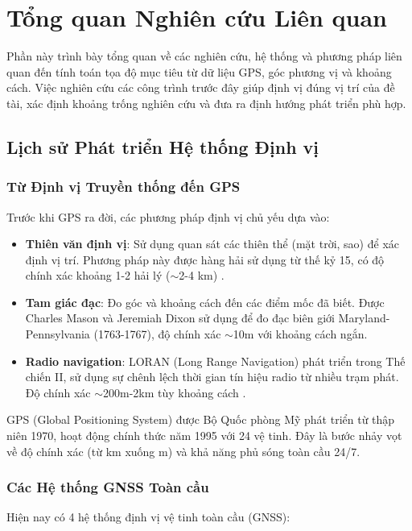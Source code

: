 \section{Tổng quan Nghiên cứu Liên quan}

Phần này trình bày tổng quan về các nghiên cứu, hệ thống và phương pháp liên quan đến tính toán tọa độ mục tiêu từ dữ liệu GPS, góc phương vị và khoảng cách. Việc nghiên cứu các công trình trước đây giúp định vị đúng vị trí của đề tài, xác định khoảng trống nghiên cứu và đưa ra định hướng phát triển phù hợp.

\subsection{Lịch sử Phát triển Hệ thống Định vị}

\subsubsection{Từ Định vị Truyền thống đến GPS}
Trước khi GPS ra đời, các phương pháp định vị chủ yếu dựa vào:
\begin{itemize}
    \item \textbf{Thiên văn định vị}: Sử dụng quan sát các thiên thể (mặt trời, sao) để xác định vị trí. Phương pháp này được hàng hải sử dụng từ thế kỷ 15, có độ chính xác khoảng 1-2 hải lý ($\sim$2-4 km) \cite{hofmann2012global}.
    
    \item \textbf{Tam giác đạc}: Đo góc và khoảng cách đến các điểm mốc đã biết. Được Charles Mason và Jeremiah Dixon sử dụng để đo đạc biên giới Maryland-Pennsylvania (1763-1767), độ chính xác $\sim$10m với khoảng cách ngắn.
    
    \item \textbf{Radio navigation}: LORAN (Long Range Navigation) phát triển trong Thế chiến II, sử dụng sự chênh lệch thời gian tín hiệu radio từ nhiều trạm phát. Độ chính xác $\sim$200m-2km tùy khoảng cách \cite{kaplan2017understanding}.
\end{itemize}

GPS (Global Positioning System) được Bộ Quốc phòng Mỹ phát triển từ thập niên 1970, hoạt động chính thức năm 1995 với 24 vệ tinh. Đây là bước nhảy vọt về độ chính xác (từ km xuống m) và khả năng phủ sóng toàn cầu 24/7.

\subsubsection{Các Hệ thống GNSS Toàn cầu}
Hiện nay có 4 hệ thống định vị vệ tinh toàn cầu (GNSS):

